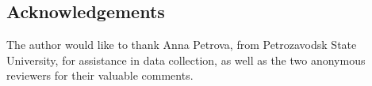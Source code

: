 \documentclass[output=paper]{langsci/langscibook}
\begin{document}
% 
% 
% 
% 
% 
% 
% 
% 
% 
% 
% 
% 
% 
% 
% 
% 
% 
% 
% 
% 
% 
% 
% 
% 
% 
% 
% 
% 
% 
% 
% 
% 
% 
% 
% 
% 


\subsection*{Acknowledgements}
The author would like to thank Anna Petrova, from Petrozavodsk State University, for assistance in data collection, as well as the two anonymous reviewers for their valuable comments.

{\sloppy
\printbibliography[heading=subbibliography,notkeyword=this]
}
\end{document}
